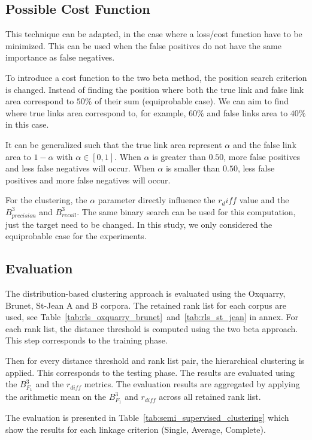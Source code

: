 \subsection{Possible Cost Function}

This technique can be adapted, in the case where a loss/cost function have to be minimized.
This can be used when the false positives do not have the same importance as false negatives.

To introduce a cost function to the two beta method, the position search criterion is changed.
Instead of finding the position where both the true link and false link area correspond to $50\%$ of their sum (equiprobable case).
We can aim to find where true links area correspond to, for example, $60\%$ and false links area to $40\%$ in this case.

It can be generalized such that the true link area represent $\alpha$ and the false link area to $1-\alpha$ with $\alpha \in \left[0,1\right]$.
When $\alpha$ is greater than $0.50$, more false positives and less false negatives will occur.
When $\alpha$ is smaller than $0.50$, less false positives and more false negatives will occur.

For the clustering, the $\alpha$ parameter directly influence the $r_diff$ value and the $B^3_{precision}$ and $B^3_{recall}$.
The same binary search can be used for this computation, just the target need to be changed.
In this study, we only considered the equiprobable case for the experiments.

\subsection{Evaluation}

The distribution-based clustering approach is evaluated using the Oxquarry, Brunet, St-Jean A and B corpora.
The retained rank list for each corpus are used, see Table~\ref{tab:rls_oxquarry_brunet}~and~\ref{tab:rls_st_jean} in annex.
For each rank list, the distance threshold is computed using the two beta approach.
This step corresponds to the training phase.

Then for every distance threshold and rank list pair, the hierarchical clustering is applied.
This corresponds to the testing phase.
The results are evaluated using the $B^3_{F_1}$ and the $r_{diff}$ metrics.
The evaluation results are aggregated by applying the arithmetic mean on the $B^3_{F_1}$ and $r_{diff}$ across all retained rank list.

The evaluation is presented in Table~\ref{tab:semi_supervised_clustering} which show the results for each linkage criterion (Single, Average, Complete).

